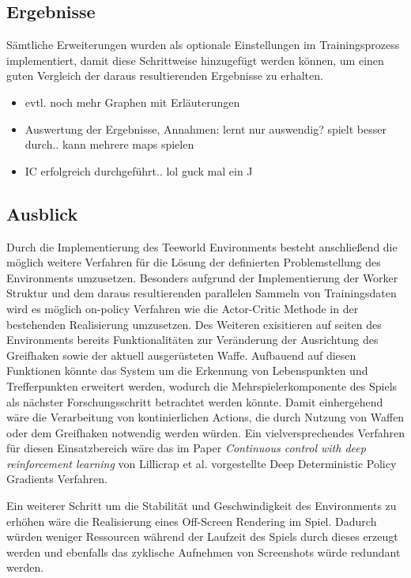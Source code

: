 \documentclass[11pt]{scrartcl}
\begin{document}
\subsection{Ergebnisse} %
\label{sec:results}
Sämtliche Erweiterungen wurden als optionale Einstellungen im Trainingsprozess implementiert,
damit diese Schrittweise hinzugefügt werden können, um einen guten Vergleich der daraus
resultierenden Ergebnisse zu erhalten.

\begin{itemize}
\itemsep0pt	
\item evtl. noch mehr Graphen mit Erläuterungen
\item Auswertung der Ergebnisse, Annahmen: lernt nur auswendig? spielt besser durch.. kann mehrere maps spielen
\item IC erfolgreich durchgeführt.. lol guck mal ein ^^
\end{itemize}

\subsection{Ausblick} %
Durch die Implementierung des Teeworld Environments besteht anschließend die möglich weitere Verfahren
für die Lösung der definierten Problemstellung des Environments umzusetzen. Besonders aufgrund der
Implementierung der Worker Struktur und dem daraus resultierenden parallelen Sammeln von Trainingsdaten
wird es möglich on-policy Verfahren wie die Actor-Critic Methode in der bestehenden Realisierung umzusetzen.
Des Weiteren exisitieren auf seiten des Environments bereits Funktionalitäten zur Veränderung der
Ausrichtung des Greifhaken sowie der aktuell ausgerüsteten Waffe. Aufbauend auf diesen Funktionen könnte
das System um die Erkennung von Lebenspunkten und Trefferpunkten erweitert werden, wodurch die
Mehrspielerkomponente des Spiels als nächster Forschungsschritt betrachtet werden könnte. Damit
einhergehend wäre die Verarbeitung von kontinierlichen Actions, die durch Nutzung von Waffen oder dem
Greifhaken notwendig werden würden. Ein vielversprechendes Verfahren für diesen Einsatzbereich wäre
das im Paper \textit{Continuous control with deep reinforcement learning} von Lillicrap et al.
\cite{LHPHETSW2016} vorgestellte Deep Deterministic Policy Gradients Verfahren.

Ein weiterer Schritt um die Stabilität und Geschwindigkeit des Environments zu erhöhen wäre die
Realisierung eines Off-Screen Rendering im Spiel. Dadurch würden weniger Ressourcen während der
Laufzeit des Spiels durch dieses erzeugt werden und ebenfalls das zyklische Aufnehmen von
Screenshots würde redundant werden.
\end{document}
